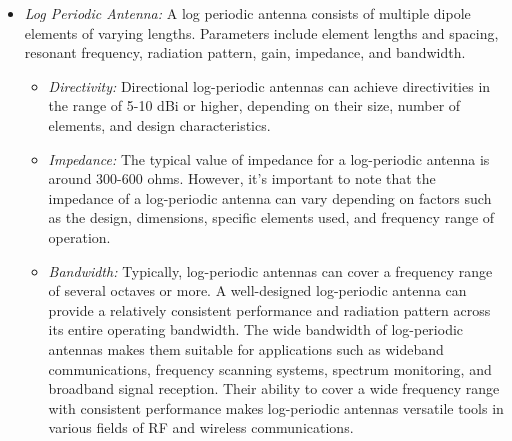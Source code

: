 \documentclass[11pt,a4paper]{article}
\begin{document}
\begin{itemize}
    \item \emph{Log Periodic Antenna:} A log periodic antenna consists of multiple dipole elements of varying lengths. Parameters include element lengths and spacing, resonant frequency, radiation pattern, gain, impedance, and bandwidth.
    \begin{itemize}
        \item \emph{Directivity:} Directional log-periodic antennas can achieve directivities in the range of 5-10 dBi or higher, depending on their size, number of elements, and design characteristics.
        \item \emph{Impedance:} The typical value of impedance for a log-periodic antenna is around 300-600 ohms. However, it's important to note that the impedance of a log-periodic antenna can vary depending on factors such as the design, dimensions, specific elements used, and frequency range of operation.
        \item \emph{Bandwidth:} Typically, log-periodic antennas can cover a frequency range of several octaves or more. A well-designed log-periodic antenna can provide a relatively consistent performance and radiation pattern across its entire operating bandwidth. The wide bandwidth of log-periodic antennas makes them suitable for applications such as wideband communications, frequency scanning systems, spectrum monitoring, and broadband signal reception. Their ability to cover a wide frequency range with consistent performance makes log-periodic antennas versatile tools in various fields of RF and wireless communications.
    \end{itemize}
    

\end{itemize}
\end{document}
